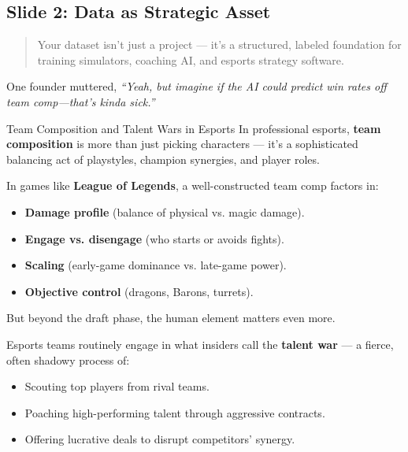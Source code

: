 \subsection{Slide 2: Data as Strategic Asset} 

\begin{quote}
Your dataset isn’t just a project — it’s a structured, labeled foundation for training simulators, coaching AI, and esports strategy software.
\end{quote}
    
    One founder muttered, \textit{``Yeah, but imagine if the AI could predict win rates off team comp—that’s kinda sick.''}

    \medskip

    \begin{HistoricalSidebar}{Team Composition and Talent Wars in Esports}
        In professional esports, \textbf{team composition} is more than just picking characters — it’s a sophisticated balancing act of playstyles, champion synergies, and player roles.

        \medskip
        
        In games like \textbf{League of Legends}, a well-constructed team comp factors in:

        \medskip

        \begin{itemize}
            \item \textbf{Damage profile} (balance of physical vs. magic damage).
            \item \textbf{Engage vs. disengage} (who starts or avoids fights).
            \item \textbf{Scaling} (early-game dominance vs. late-game power).
            \item \textbf{Objective control} (dragons, Barons, turrets).
        \end{itemize}

        \medskip
        
        But beyond the draft phase, the human element matters even more.
        
        \medskip
        
        Esports teams routinely engage in what insiders call the \textbf{talent war} — a fierce, often shadowy process of:

        \medskip

        \begin{itemize}
            \item Scouting top players from rival teams.
            \item Poaching high-performing talent through aggressive contracts.
            \item Offering lucrative deals to disrupt competitors’ synergy.
        \end{itemize}


\end{HistoricalSidebar}

